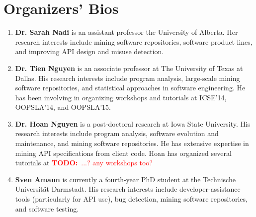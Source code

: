 \documentclass[10pt, conference]{IEEEtran}
\newcommand{\todo}[1]{{\textcolor{red}{\textbf{TODO:}~#1}}}
\begin{document}
\section{Organizers' Bios}
\begin{enumerate}
\item \textbf{Dr. Sarah Nadi} is an assistant professor the University of Alberta. Her research interests include mining software repositories, software product lines, and improving API design and misuse detection.

\item \textbf{Dr. Tien Nguyen} is an associate professor at The University of Texas at Dallas. His research interests include program analysis, large-scale mining software repositories, and statistical approaches in software engineering. He has been involving in organizing workshops and tutorials at ICSE’14, OOPSLA’14, and OOPSLA’15.

\item \textbf{Dr. Hoan Nguyen} is a post-doctoral research at Iowa State University. His research interests include program analysis, software evolution and maintenance, and mining software repositories. He has extensive expertise in mining API specifications from client code. Hoan has organized several tutorials at \todo{...? any workshops too?}

\item \textbf{Sven Amann} is currently a fourth-year PhD student at the Technische Universit\"{a}t Darmstadt. His research interests include developer-assistance tools (particularly for API use), bug detection, mining software repositories, and software testing.
\end{enumerate}



\end{document}
